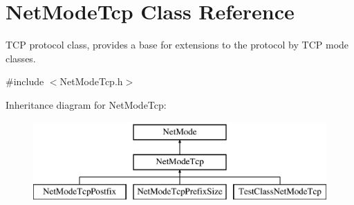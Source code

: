 \hypertarget{class_net_mode_tcp}{
\section{NetModeTcp Class Reference}
\label{class_net_mode_tcp}
}


TCP protocol class, provides a base for extensions to the protocol by TCP mode classes.  




{\ttfamily \#include $<$NetModeTcp.h$>$}

Inheritance diagram for NetModeTcp:\begin{figure}[H]
\begin{center}
\leavevmode
\includegraphics[height=3.000000cm]{class_net_mode_tcp}
\end{center}
\end{figure}
